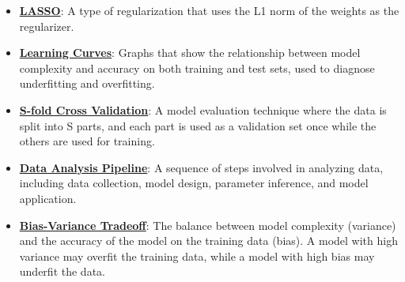\documentclass{article}%
\begin{document}
\begin{itemize}[leftmargin=*]
\item \href{https://purdue.brightspace.com/d2l/common/assets/pdfjs-d2l-dist/1.0.14-legacy/web/viewer.html?file=\%2Fcontent\%2Fenforced\%2F1095467-wl.202510.CS.24300.001\%2F10L1-CrossValidation.pdf\%3Fou\%3D1095467\&lang=en-us\&container=d2l-fileviewer-rendered-pdf\&fullscreen=d2l-fileviewer-rendered-pdf-dialog\&height=667#page=17}{\textbf{LASSO}}: A type of regularization that uses the L1 norm of the weights as the regularizer.%
\item \href{https://purdue.brightspace.com/d2l/common/assets/pdfjs-d2l-dist/1.0.14-legacy/web/viewer.html?file=\%2Fcontent\%2Fenforced\%2F1095467-wl.202510.CS.24300.001\%2F10L1-CrossValidation.pdf\%3Fou\%3D1095467\&lang=en-us\&container=d2l-fileviewer-rendered-pdf\&fullscreen=d2l-fileviewer-rendered-pdf-dialog\&height=667#page=20}{\textbf{Learning Curves}}: Graphs that show the relationship between model complexity and accuracy on both training and test sets, used to diagnose underfitting and overfitting.%
\item \href{https://purdue.brightspace.com/d2l/common/assets/pdfjs-d2l-dist/1.0.14-legacy/web/viewer.html?file=\%2Fcontent\%2Fenforced\%2F1095467-wl.202510.CS.24300.001\%2F10L1-CrossValidation.pdf\%3Fou\%3D1095467\&lang=en-us\&container=d2l-fileviewer-rendered-pdf\&fullscreen=d2l-fileviewer-rendered-pdf-dialog\&height=667#page=25}{\textbf{S-fold Cross Validation}}: A model evaluation technique where the data is split into S parts, and each part is used as a validation set once while the others are used for training.%
\item \href{https://purdue.brightspace.com/d2l/common/assets/pdfjs-d2l-dist/1.0.14-legacy/web/viewer.html?file=\%2Fcontent\%2Fenforced\%2F1095467-wl.202510.CS.24300.001\%2F10L1-CrossValidation.pdf\%3Fou\%3D1095467\&lang=en-us\&container=d2l-fileviewer-rendered-pdf\&fullscreen=d2l-fileviewer-rendered-pdf-dialog\&height=667#page=26}{\textbf{Data Analysis Pipeline}}: A sequence of steps involved in analyzing data, including data collection, model design, parameter inference, and model application.%
\item \href{https://purdue.brightspace.com/d2l/common/assets/pdfjs-d2l-dist/1.0.14-legacy/web/viewer.html?file=\%2Fcontent\%2Fenforced\%2F1095467-wl.202510.CS.24300.001\%2F11L2-svd-pca-recommender.pdf\%3Fou\%3D1095467\&lang=en-us\&container=d2l-fileviewer-rendered-pdf\&fullscreen=d2l-fileviewer-rendered-pdf-dialog\&height=667#page=53}{\textbf{Bias-Variance Tradeoff}}: The balance between model complexity (variance) and the accuracy of the model on the training data (bias). A model with high variance may overfit the training data, while a model with high bias may underfit the data.%
\end{itemize}
\end{document}
